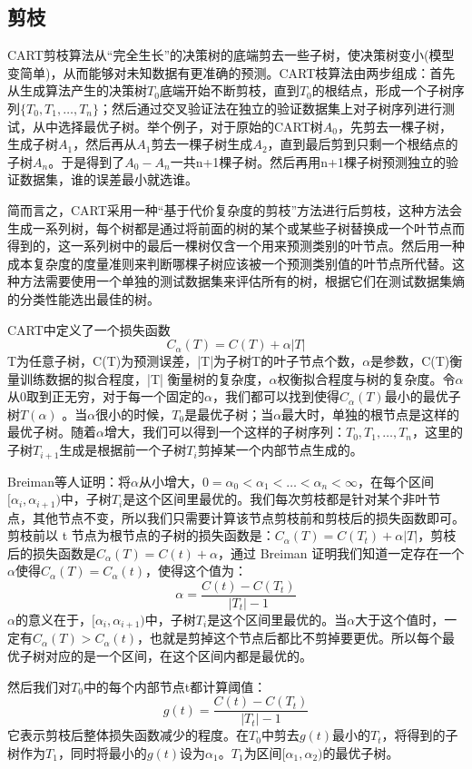 \documentclass[fontset=windows]{article}
\begin{document}
\subsection{剪枝}

CART剪枝算法从“完全生长”的决策树的底端剪去一些子树，使决策树变小(模型变简单)，从而能够对未知数据有更准确的预测。CART枝算法由两步组成：首先从生成算法产生的决策树$T_0$底端开始不断剪枝，直到$T_0$的根结点，形成一个子树序列$\{T_0,T_1,\dots,T_n\}$；然后通过交叉验证法在独立的验证数据集上对子树序列进行测试，从中选择最优子树。举个例子，对于原始的CART树$A_0$，先剪去一棵子树，生成子树$A_1$，然后再从$A_1$剪去一棵子树生成$A_2$，直到最后剪到只剩一个根结点的子树$A_n$。于是得到了$A_0-A_n$一共n+1棵子树。然后再用n+1棵子树预测独立的验证数据集，谁的误差最小就选谁。

简而言之，CART采用一种“基于代价复杂度的剪枝”方法进行后剪枝，这种方法会生成一系列树，每个树都是通过将前面的树的某个或某些子树替换成一个叶节点而得到的，这一系列树中的最后一棵树仅含一个用来预测类别的叶节点。然后用一种成本复杂度的度量准则来判断哪棵子树应该被一个预测类别值的叶节点所代替。这种方法需要使用一个单独的测试数据集来评估所有的树，根据它们在测试数据集熵的分类性能选出最佳的树。

CART中定义了一个损失函数$$C_\alpha(T)=C(T)+\alpha|T|$$T为任意子树，C(T)为预测误差，|T|为子树T的叶子节点个数，$\alpha$是参数，C(T)衡量训练数据的拟合程度，|T|
衡量树的复杂度，$\alpha$权衡拟合程度与树的复杂度。令$\alpha$从0取到正无穷，对于每一个固定的$\alpha$，我们都可以找到使得$C_\alpha(T)$最小的最优子树$T(\alpha)$
。当$\alpha$很小的时候，$T_0$是最优子树；当$\alpha$最大时，单独的根节点是这样的最优子树。随着$\alpha$增大，我们可以得到一个这样的子树序列：$T_0,T_1,\dots,T_n$，这里的子树$T_{i+1}$生成是根据前一个子树$T_i$剪掉某一个内部节点生成的。

Breiman等人证明：将$\alpha$从小增大，$0=\alpha_0<\alpha_1<\dots<\alpha_n<\infty$，在每个区间$[\alpha_i,\alpha_{i+1})$中，子树$T_i$是这个区间里最优的。我们每次剪枝都是针对某个非叶节点，其他节点不变，所以我们只需要计算该节点剪枝前和剪枝后的损失函数即可。剪枝前以 t 节点为根节点的子树的损失函数是：$C_\alpha(T)=C(T_t)+\alpha|T|$，剪枝后的损失函数是$C_\alpha(T)=C(t)+\alpha$，通过 Breiman 证明我们知道一定存在一个$\alpha$使得$C_\alpha(T)=C_\alpha(t)$，使得这个值为：$$\alpha=\frac{C(t)-C(T_t)}{|T_t|-1}$$$\alpha$的意义在于，$[\alpha_i,\alpha_{i+1})$中，子树$T_i$是这个区间里最优的。当$\alpha$大于这个值时，一定有$C_\alpha(T)>C_\alpha(t)$，也就是剪掉这个节点后都比不剪掉要更优。所以每个最优子树对应的是一个区间，在这个区间内都是最优的。

然后我们对$T_0$中的每个内部节点t都计算阈值：$$g(t)=\frac{C(t)-C(T_t)}{|T_t|-1}$$它表示剪枝后整体损失函数减少的程度。在$T_0$中剪去$g(t)$最小的$T_t$，将得到的子树作为$T_1$，同时将最小的$g(t)$设为$\alpha_1$。$T_1$为区间$[\alpha_1,\alpha_2)$的最优子树。
\end{document}
